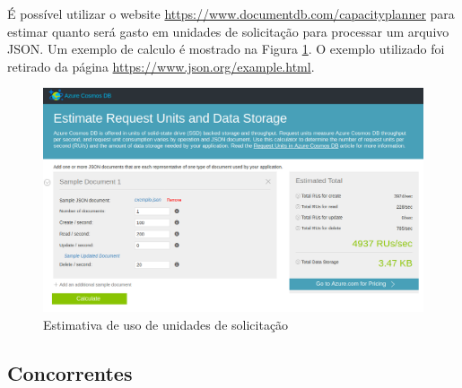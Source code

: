 \documentclass[12pt]{article}
\begin{document}
É possível utilizar o website \url{https://www.documentdb.com/capacityplanner} para estimar quanto será gasto em unidades de solicitação para processar um arquivo JSON. Um exemplo de calculo é mostrado na
Figura \ref{fig:az6}. O exemplo utilizado foi retirado da página \url{https://www.json.org/example.html}.

\begin{figure}[H]
	\label{fig:az6}
	\caption{Estimativa de uso de unidades de solicitação}
	\includegraphics[scale=0.37]{img/az6.png}
	\centering
\end{figure}

\subsection{Concorrentes}


\end{document}
